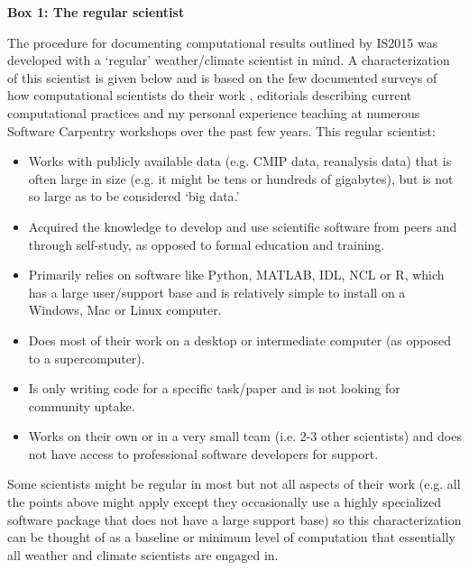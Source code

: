 \textbf{Box 1: The regular scientist}

The procedure for documenting computational results outlined by IS2015 was developed with a `regular' weather/climate scientist in mind. A characterization of this scientist is given below and is based on the few documented surveys of how computational scientists do their work \citep{Hannay2009,Stodden2010,Momcheva2015}, editorials describing current computational practices \citep[e.g.][]{Easterbrook2014} and my personal experience teaching at numerous Software Carpentry workshops \citep{Wilson2014} over the past few years. This regular scientist:
\begin{itemize}
\item Works with publicly available data (e.g. CMIP data, reanalysis data) that is often large in size (e.g. it might be tens or hundreds of gigabytes), but is not so large as to be considered `big data.' 
\item Acquired the knowledge to develop and use scientific software from peers and through self-study, as opposed to formal education and training.
\item Primarily relies on software like Python, MATLAB, IDL, NCL or R, which has a large user/support base and is relatively simple to install on a Windows, Mac or Linux computer.
\item Does most of their work on a desktop or intermediate computer (as opposed to a supercomputer).
\item Is only writing code for a specific task/paper and is not looking for community uptake.  
\item Works on their own or in a very small team (i.e. 2-3 other scientists) and does not have access to professional software developers for support.
\end{itemize}

Some scientists might be regular in most but not all aspects of their work (e.g. all the points above might apply except they occasionally use a highly specialized software package that does not have a large support base) so this characterization can be thought of as a baseline or minimum level of computation that essentially all weather and climate scientists are engaged in.  

  
  
  
  
  
  
  
  
  
  